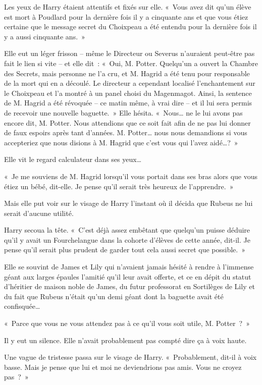 Les yeux de Harry étaient attentifs et fixés sur elle. «~Vous avez dit qu'un élève est mort à Poudlard pour la dernière fois il y a cinquante ans et que vous étiez certaine que le message secret du Choixpeau a été entendu pour la dernière fois il y a aussi cinquante ans.~»

Elle eut un léger frisson -- même le Directeur ou Severus n'auraient peut-être pas fait le lien si vite -- et elle dit~: «~Oui, M. Potter. Quelqu'un a ouvert la Chambre des Secrets, mais personne ne l'a cru, et M. Hagrid a été tenu pour responsable de la mort qui en a découlé. Le directeur a cependant localisé l'enchantement sur le Choixpeau et l'a montré à un panel choisi du Magenmagot. Ainsi, la sentence de M. Hagrid a été révoquée -- ce matin même, à vrai dire -- et il lui sera permis de recevoir une nouvelle baguette.~» Elle hésita. «~Nous… ne le lui avons pas encore dit, M. Potter. Nous attendions que ce soit fait afin de ne pas lui donner de faux espoirs après tant d'années. M. Potter… nous nous demandions si vous accepteriez que nous disions à M. Hagrid que c'est vous qui l'avez aidé…?~»

Elle vit le regard calculateur dans ses yeux…

«~Je me souviens de M. Hagrid lorsqu'il vous portait dans ses bras alors que vous étiez un bébé, dit-elle. Je pense qu'il serait très heureux de l'apprendre.~»

Mais elle put voir sur le visage de Harry l'instant où il décida que Rubeus ne lui serait d'aucune utilité.

Harry secoua la tête. «~C'est déjà assez embêtant que quelqu'un puisse déduire qu'il y avait un Fourchelangue dans la cohorte d'élèves de cette année, dit-il. Je pense qu'il serait plus prudent de garder tout cela aussi secret que possible.~»

Elle se souvint de James et Lily qui n'avaient jamais hésité à rendre à l'immense géant aux larges épaules l'amitié qu'il leur avait offerte, et ce en dépit du statut d'héritier de maison noble de James, du futur professorat en Sortilèges de Lily et du fait que Rubeus n'était qu'un demi géant dont la baguette avait été confisquée…

«~Parce que vous ne vous attendez pas à ce qu'il vous soit utile, M. Potter~?~»

Il y eut un silence. Elle n'avait probablement pas compté dire ça à voix haute.

Une vague de tristesse passa sur le visage de Harry. «~Probablement, dit-il à voix basse. Mais je pense que lui et moi ne deviendrions pas amis. Vous ne croyez pas~?~»


